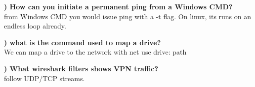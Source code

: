\documentclass{report}
\newcommand{\mysubsection}[2]{\textbf{\romannumeral #1) #2}}
\begin{document}
\noindent\mysubsection{11}{How can you initiate a permanent ping from a Windows CMD?}
\\from Windows CMD you would issue ping with a -t flag. On linux, its runs on
an endless loop already.

\noindent\mysubsection{12}{what is the command used to map a drive?}
\\We can map a drive to the network with net use {drive}: {path} 

\noindent\mysubsection{13}{What wireshark filters shows VPN traffic?}
\\follow UDP/TCP streams.

\end{document}
